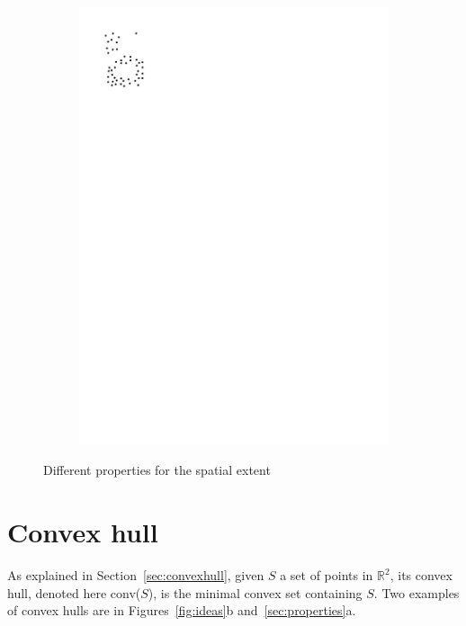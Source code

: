 \begin{figure}
\begin{subfigure}[b]{0.15\linewidth}
    \includegraphics[page=3,width=\textwidth]{figs/properties.pdf}
    \caption{}
  \end{subfigure}
\caption{Different properties for the spatial extent}
\label{fig:properties}  
\end{figure}


%
\section{Convex hull}

As explained in Section~\ref{sec:convexhull}, given $S$ a set of points in $\mathbb{R}^2$, its convex hull, denoted here conv($S$), is the minimal convex set containing $S$.
Two examples of convex hulls are in Figures~\ref{fig:ideas}b and~\ref{sec:properties}a.

%

